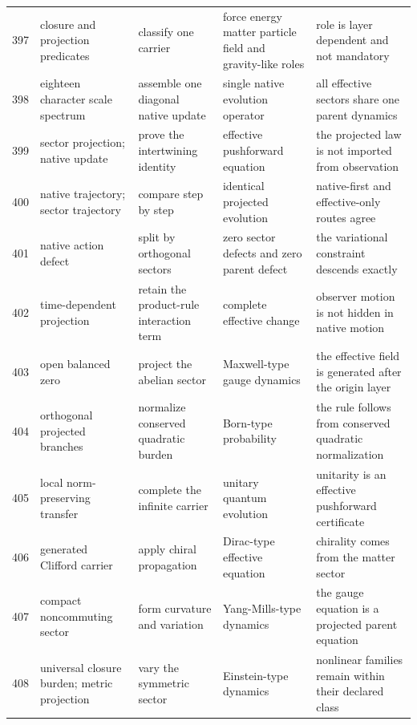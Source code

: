 \documentclass[11pt]{article}
\numberwithin{equation}{section}
\theoremstyle{remark}
\begin{document}
\begin{landscape}
\begin{longtable}{p{0.65cm}p{3.5cm}p{4.0cm}p{4.0cm}p{4.6cm}}
397&closure and projection predicates&classify one carrier&force energy matter particle field and gravity-like roles&role is layer dependent and not mandatory\\
398&eighteen character scale spectrum&assemble one diagonal native update&single native evolution operator&all effective sectors share one parent dynamics\\
399&sector projection; native update&prove the intertwining identity&effective pushforward equation&the projected law is not imported from observation\\
400&native trajectory; sector trajectory&compare step by step&identical projected evolution&native-first and effective-only routes agree\\
401&native action defect&split by orthogonal sectors&zero sector defects and zero parent defect&the variational constraint descends exactly\\
402&time-dependent projection&retain the product-rule interaction term&complete effective change&observer motion is not hidden in native motion\\
403&open balanced zero&project the abelian sector&Maxwell-type gauge dynamics&the effective field is generated after the origin layer\\
404&orthogonal projected branches&normalize conserved quadratic burden&Born-type probability&the rule follows from conserved quadratic normalization\\
405&local norm-preserving transfer&complete the infinite carrier&unitary quantum evolution&unitarity is an effective pushforward certificate\\
406&generated Clifford carrier&apply chiral propagation&Dirac-type effective equation&chirality comes from the matter sector\\
407&compact noncommuting sector&form curvature and variation&Yang-Mills-type dynamics&the gauge equation is a projected parent equation\\
408&universal closure burden; metric projection&vary the symmetric sector&Einstein-type dynamics&nonlinear families remain within their declared class\\
\bottomrule\end{longtable}

\end{landscape}
\end{document}
